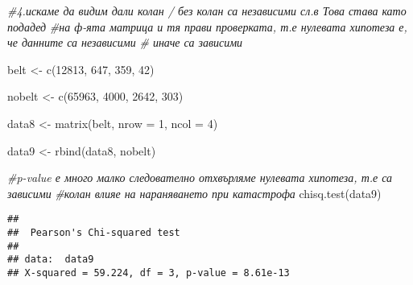 \documentclass[
]{article}
\newenvironment{Shaded}{\begin{snugshade}}{\end{snugshade}}
\newcommand{\AttributeTok}[1]{\textcolor[rgb]{0.77,0.63,0.00}{#1}}
\newcommand{\CommentTok}[1]{\textcolor[rgb]{0.56,0.35,0.01}{\textit{#1}}}
\newcommand{\DecValTok}[1]{\textcolor[rgb]{0.00,0.00,0.81}{#1}}
\newcommand{\FunctionTok}[1]{\textcolor[rgb]{0.00,0.00,0.00}{#1}}
\newcommand{\NormalTok}[1]{#1}
\newcommand{\OtherTok}[1]{\textcolor[rgb]{0.56,0.35,0.01}{#1}}
\begin{document}
\begin{Shaded}
\begin{Highlighting}[]
\CommentTok{\#4.искаме да видим дали колан / без колан са независими сл.в Това става като подадед}
\CommentTok{\#на ф{-}ята матрица и тя прави проверката, т.е нулевата хипотеза е, че данните са независими}
\CommentTok{\# иначе са зависими}

\NormalTok{belt }\OtherTok{\textless{}{-}} \FunctionTok{c}\NormalTok{(}\DecValTok{12813}\NormalTok{, }\DecValTok{647}\NormalTok{, }\DecValTok{359}\NormalTok{, }\DecValTok{42}\NormalTok{)}

\NormalTok{nobelt }\OtherTok{\textless{}{-}} \FunctionTok{c}\NormalTok{(}\DecValTok{65963}\NormalTok{, }\DecValTok{4000}\NormalTok{, }\DecValTok{2642}\NormalTok{, }\DecValTok{303}\NormalTok{)}

\NormalTok{data8 }\OtherTok{\textless{}{-}} \FunctionTok{matrix}\NormalTok{(belt, }\AttributeTok{nrow =} \DecValTok{1}\NormalTok{, }\AttributeTok{ncol =} \DecValTok{4}\NormalTok{)}

\NormalTok{data9 }\OtherTok{\textless{}{-}} \FunctionTok{rbind}\NormalTok{(data8, nobelt)}

\CommentTok{\#p{-}value е много малко следователно отхвърляме нулевата хипотеза, т.е са зависими}
\CommentTok{\#колан влияе на нараняването при катастрофа}
\FunctionTok{chisq.test}\NormalTok{(data9)}
\end{Highlighting}
\end{Shaded}

\begin{verbatim}
## 
##  Pearson's Chi-squared test
## 
## data:  data9
## X-squared = 59.224, df = 3, p-value = 8.61e-13
\end{verbatim}
\end{document}
